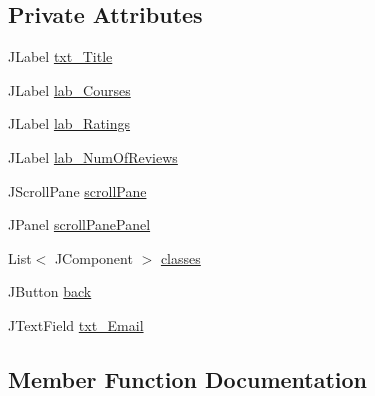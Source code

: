 \subsection*{Private Attributes}
\begin{DoxyCompactItemize}
\item 
J\+Label \mbox{\hyperlink{classcom_1_1_b_n_u_1_1pages_1_1classes_by_teacher_1_1_class_by_teacher_model_af0afc2a21bdb3e4c161fd99a5474cc71}{txt\+\_\+\+Title}}
\item 
J\+Label \mbox{\hyperlink{classcom_1_1_b_n_u_1_1pages_1_1classes_by_teacher_1_1_class_by_teacher_model_ad1d43ebc2aa7a6c47eadad1534d9b99a}{lab\+\_\+\+Courses}}
\item 
J\+Label \mbox{\hyperlink{classcom_1_1_b_n_u_1_1pages_1_1classes_by_teacher_1_1_class_by_teacher_model_ac818d8d719e033aab497e6ca4a3f959a}{lab\+\_\+\+Ratings}}
\item 
J\+Label \mbox{\hyperlink{classcom_1_1_b_n_u_1_1pages_1_1classes_by_teacher_1_1_class_by_teacher_model_a63049c01b6ca440edacca4fd751bba0a}{lab\+\_\+\+Num\+Of\+Reviews}}
\item 
J\+Scroll\+Pane \mbox{\hyperlink{classcom_1_1_b_n_u_1_1pages_1_1classes_by_teacher_1_1_class_by_teacher_model_a4a33ed46a024cdc731c3e44419ed5d97}{scroll\+Pane}}
\item 
J\+Panel \mbox{\hyperlink{classcom_1_1_b_n_u_1_1pages_1_1classes_by_teacher_1_1_class_by_teacher_model_ae2a7f0ecd93f19a95bd4b09a48080c76}{scroll\+Pane\+Panel}}
\item 
List$<$ J\+Component $>$ \mbox{\hyperlink{classcom_1_1_b_n_u_1_1pages_1_1classes_by_teacher_1_1_class_by_teacher_model_aa405ae1c16a9b5a9628f3c611f114b02}{classes}}
\item 
J\+Button \mbox{\hyperlink{classcom_1_1_b_n_u_1_1pages_1_1classes_by_teacher_1_1_class_by_teacher_model_ade100a669f1d7119104eb5eae7e55b80}{back}}
\item 
J\+Text\+Field \mbox{\hyperlink{classcom_1_1_b_n_u_1_1pages_1_1classes_by_teacher_1_1_class_by_teacher_model_ad17ea527f82abedcab1d224bfa61195f}{txt\+\_\+\+Email}}
\end{DoxyCompactItemize}


\subsection{Member Function Documentation}
\mbox{\label{classcom_1_1_b_n_u_1_1pages_1_1classes_by_teacher_1_1_class_by_teacher_model_aa637bd5b69bb7c245eb32107aa8683ab}} 
